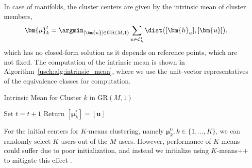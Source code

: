 In case of manifolds, the cluster centers are given by the intrinsic mean of cluster members,
\begin{align}
	\bm{\mu}_k^t=\argmin_{[\bm{u}]\in\mathrm{GR}(M,1)}\sum_{n \in {\mathcal{C}_k^t}} \dist\big([\bm{h}_u],[\bm{u}]\big),
\end{align}
which has no closed-form solution as it depends on reference points, which are not fixed. 
The computation of the intrinsic mean is shown in Algorithm~\ref{usch:alg:intrinsic_mean}, where we use the unit-vector representatives of the equivalence classes for computation.
\begin{algorithm}[htb]
	\caption{Intrinsic Mean for Cluster $k$ in $\mathrm{GR}(M,1)$}
	\label{usch:alg:intrinsic_mean}
	\begin{algorithmic}[1]
		\State Set $t=t+1$
		\EndWhile
		\State Return $[\bm{\mu}_k^t]=[\bm{u}]$
	\end{algorithmic}
\end{algorithm}

For the initial centers for $K$-means clustering, namely ${\bm{\mu}}_k^0, k \in \{1,\ldots,K\}$, we can randomly select $K$ users out of the $M$ users. 
However, performance of $K$-means could suffer due to poor initialization, and instead we initialize using $K$-means++ to mitigate this effect \cite{Arthur2007kmeanspp}.

